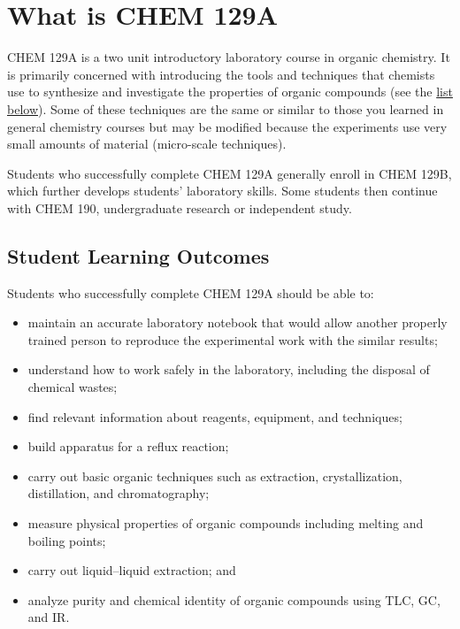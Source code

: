 \hypertarget{what-is-chem-129a}{%
\section{What is CHEM 129A}\label{what-is-chem-129a}}

CHEM 129A is a two unit introductory laboratory course in organic
chemistry. It is primarily concerned with introducing the tools and
techniques that chemists use to synthesize and investigate the
properties of organic compounds (see the \protect\hyperlink{slo}{list
below}). Some of these techniques are the same or similar to those you
learned in general chemistry courses but may be modified because the
experiments use very small amounts of material (micro-scale techniques).

Students who successfully complete CHEM 129A generally enroll in CHEM
129B, which further develops students' laboratory skills. Some students
then continue with CHEM 190, undergraduate research or independent
study.

\hypertarget{slo}{%
\subsection{Student Learning Outcomes}\label{slo}}

Students who successfully complete CHEM 129A should be able to:

\begin{itemize}
\tightlist
\item
  maintain an accurate laboratory notebook that would allow another
  properly trained person to reproduce the experimental work with the
  similar results;
\item
  understand how to work safely in the laboratory, including the
  disposal of chemical wastes;
\item
  find relevant information about reagents, equipment, and techniques;
\item
  build apparatus for a reflux reaction;
\item
  carry out basic organic techniques such as extraction,
  crystallization, distillation, and chromatography;
\item
  measure physical properties of organic compounds including melting and
  boiling points;
\item
  carry out liquid--liquid extraction; and
\item
  analyze purity and chemical identity of organic compounds using TLC,
  GC, and IR.
\end{itemize}

